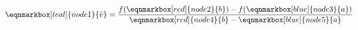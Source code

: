 \documentclass[10pt]{article}
\begin{document}
\begin{equation*}
  \eqnmarkbox[teal]{node1}{\bar{v}} = \dfrac{f(\eqnmarkbox[red]{node2}{b}) - f(\eqnmarkbox[blue]{node3}{a})}{\eqnmarkbox[red]{node4}{b} - \eqnmarkbox[blue]{node5}{a}}
\end{equation*}

\end{document}
